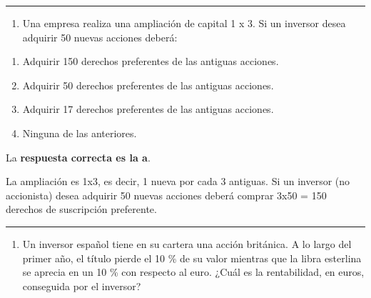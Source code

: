 \documentclass[
  letterpaper,
  DIV=11,
  numbers=noendperiod]{scrreprt}
\providecommand{\tightlist}{%
  \setlength{\itemsep}{0pt}\setlength{\parskip}{0pt}}\usepackage{longtable,booktabs,array}
\begin{document}
\begin{center}\rule{0.5\linewidth}{0.5pt}\end{center}

\begin{enumerate}
\def\labelenumi{\arabic{enumi}.}
\setcounter{enumi}{76}
\tightlist
\item
  Una empresa realiza una ampliación de capital 1 x 3. Si un inversor
  desea adquirir 50 nuevas acciones deberá:
\end{enumerate}

\begin{enumerate}
\def\labelenumi{\alph{enumi}.}
\item
  Adquirir 150 derechos preferentes de las antiguas acciones.
\item
  Adquirir 50 derechos preferentes de las antiguas acciones.
\item
  Adquirir 17 derechos preferentes de las antiguas acciones.
\item
  Ninguna de las anteriores.
\end{enumerate}

\begin{tcolorbox}[enhanced jigsaw, left=2mm, opacityback=0, colback=white, breakable, arc=.35mm, bottomrule=.15mm, rightrule=.15mm, toprule=.15mm, leftrule=.75mm, colframe=quarto-callout-tip-color-frame]
\begin{minipage}[t]{5.5mm}
\textcolor{quarto-callout-tip-color}{\faLightbulb}
\end{minipage}%
\begin{minipage}[t]{\textwidth - 5.5mm}

La \textbf{respuesta correcta es la a}.

La ampliación es 1x3, es decir, 1 nueva por cada 3 antiguas. Si un
inversor (no accionista) desea adquirir 50 nuevas acciones deberá
comprar 3x50 = 150 derechos de suscripción preferente.

\end{minipage}%
\end{tcolorbox}

\begin{center}\rule{0.5\linewidth}{0.5pt}\end{center}

\begin{enumerate}
\def\labelenumi{\arabic{enumi}.}
\setcounter{enumi}{77}
\tightlist
\item
  Un inversor español tiene en su cartera una acción británica. A lo
  largo del primer año, el título pierde el 10 \% de su valor mientras
  que la libra esterlina se aprecia en un 10 \% con respecto al euro.
  ¿Cuál es la rentabilidad, en euros, conseguida por el inversor?
\end{enumerate}
\end{document}

